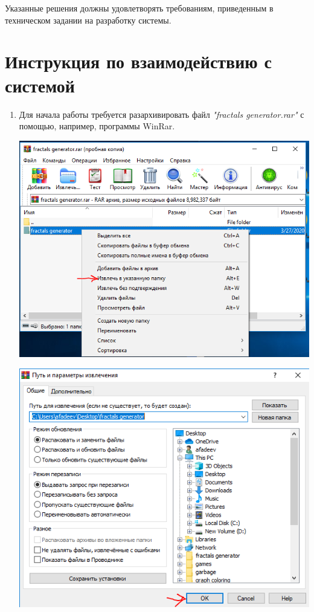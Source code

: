 \documentclass[a4paper,12pt,preview]{report} %
\begin{document}
	Указанные решения должны удовлетворять требованиям, приведенным в техническом задании на разработку системы.
	
	\section{Инструкция по взаимодействию с системой}
	
	\begin{enumerate}
		\item Для начала работы требуется разархивировать файл \textit{"fractals generator.rar"} с помощью, например, программы WinRar.
		
		\includegraphics[scale=0.5]{Capture1.PNG}
		
		\includegraphics[scale=0.6]{Capture2.PNG}
		

\end{enumerate}
\end{document}
